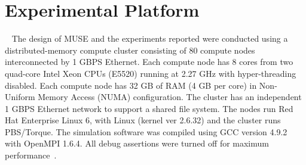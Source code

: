 \section{Experimental Platform}~\label{sec:platform}
The design of MUSE and the experiments reported were conducted using a distributed-memory compute cluster consisting of 80 compute nodes interconnected by 1 GBPS Ethernet. Each compute node has 8 cores from two quad-core Intel Xeon \textregistered CPUs (E5520) running at 2.27 GHz with hyper-threading disabled. Each compute node has 32 GB of RAM (4 GB per core) in Non-Uniform Memory Access (NUMA) configuration. The cluster has an independent 1 GBPS Ethernet network to support a shared file system. The nodes run Red Hat Enterprise Linux 6, with Linux (kernel ver 2.6.32) and the cluster runs PBS/Torque. The simulation software was compiled using GCC version 4.9.2 with OpenMPI 1.6.4. All debug assertions were turned off for maximum performance~\cite{higiro2017multi}.
